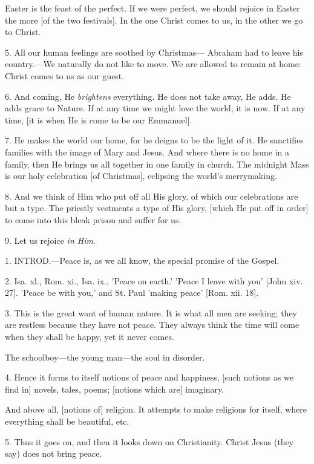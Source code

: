 Easter is the feast of the perfect. If we were
perfect, we should rejoice in Easter the more [of the two festivals].
In the one Christ comes to us, in the other we go to Christ.

5. All our human feelings are soothed by
Christmas— Abraham had to leave his country.—We naturally do
not like to move. We are allowed to remain at home: Christ comes to us
as our guest.

6. And coming, He \emph{brightens} everything. He
does not take away, He adds. He adds grace to Nature. If at any time
we might love the world, it is now. If at any time, [it is when He is
come to be our Emmanuel].

7. He makes the world our home, for he deigns to
be the light of it. He sanctifies families with the image of Mary and
Jesus. And where there is no home in a family, then He brings us all
together in one family in church. The midnight Mass is our holy
celebration [of Christmas], eclipsing the world's merrymaking.

8. And we think of Him who put off all His glory,
of which our celebrations are but a type. The priestly vestments a
type of His glory, [which He put off in order] to come into this bleak
prison and suffer for us.

9. Let us rejoice \emph{in Him}.


1. INTROD.—Peace
is, as we all know, the special promise of the Gospel.

2. Isa. xl., Rom. xi., Isa. ix., 'Peace on
earth.' 'Peace I leave with you' [John xiv. 27]. 'Peace be with you,'
and St. Paul 'making peace' [Rom. xii. 18].

3. This is the great want of human nature. It is
what all men are seeking; they are restless because they have not
peace. They always think the time will come when they shall be happy,
yet it never comes.

The schoolboy—the young man—the soul in
disorder.

4. Hence it forms to itself notions of peace and
happiness, [such notions as we find in] novels, tales, poems; [notions
which are] imaginary.

And above all, [notions of] religion. It attempts
to make religions for itself, where everything shall be beautiful,
etc.

5. Thus it goes on, and then it looks down on
Christianity. Christ Jesus (they say) does not bring peace.

